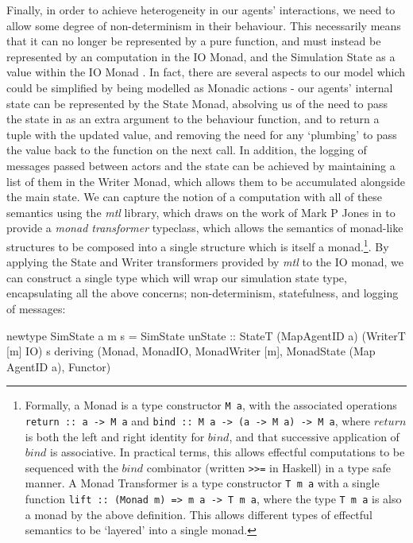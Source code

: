 \documentclass[a4paper, 11pt]{article}
\begin{document}
Finally, in order to achieve heterogeneity in our agents' interactions, we need to allow some degree of non-determinism in their behaviour. This necessarily means that it can no longer be represented by a pure function, and must instead be represented by an computation in the IO Monad, and the Simulation State as a value within the IO Monad \cite{Wadler1992}.
In fact, there are several aspects to our model which could be simplified by being modelled as Monadic actions - our agents' internal state can be represented by the State Monad, absolving us of the need to pass the state in as an extra argument to the behaviour function, and to return a tuple with the updated value, and removing the need for any `plumbing' to pass the value back to the function on the next call. In addition, the logging of messages passed between actors and the state can be achieved by maintaining a list of them in the Writer Monad, which allows them to be accumulated alongside the main state. We can capture the notion of a computation with all of these semantics using the \emph{mtl} library, which draws on the work of Mark P Jones in \cite{Jones1995} to provide a \emph{monad transformer} typeclass, which allows the semantics of monad-like structures to be composed into a single structure which is itself a monad.\footnote {Formally, a Monad is a type constructor \texttt{M a}, with the associated operations \texttt{return :: a -> M a} and \texttt{bind :: M a -> (a -> M a) -> M a}, where $return$ is both the left and right identity for $bind$, and that successive application of $bind$ is associative. In practical terms, this allows effectful computations to be sequenced with the $bind$ combinator (written \texttt{>>=} in Haskell) in a type safe manner. A Monad Transformer is a type constructor \texttt{T m a} with a single function \texttt{lift :: (Monad m) => m a -> T m a}, where the type \texttt{T m a} is also a monad by the above definition. This allows different types of effectful semantics to be `layered' into a single monad.}. By applying the State and Writer transformers provided by \emph{mtl} to the IO monad, we can construct a single type which will wrap our simulation state type, encapsulating all the above concerns; non-determinism, statefulness, and logging of messages:
\begin{code}
  newtype SimState a m s = SimState {
    unState :: StateT (MapAgentID a) (WriterT [m] IO) s
  } deriving (Monad, MonadIO, MonadWriter [m], MonadState (Map AgentID a), Functor)
\end{code}
\end{document}
